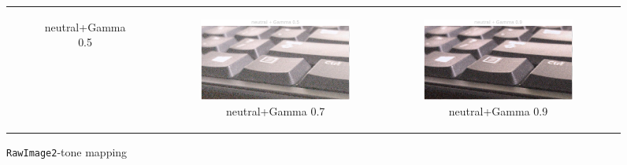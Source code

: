 \documentclass[11pt, a4]{article}
\begin{document}
\begin{enumerate}
\begin{enumerate}
\begin{figure}[h]
{\begin{tabular}{cccc}
\begin{subfigure}[h]{0.45\linewidth}
							\caption{neutral+Gamma 0.5}
							\label{fig:RawImage2_tone_10}
						\end{subfigure} &
						\begin{subfigure}[h]{0.45\linewidth}
							\centering
							\includegraphics[width=\linewidth]{../output/RawImage2_Tone_neutral_Gamma0.5.pdf}
							\caption{neutral+Gamma 0.7}
							\label{fig:RawImage2_tone_11}
						\end{subfigure} &
						\begin{subfigure}[h]{0.45\linewidth}
							\centering
							\includegraphics[width=\linewidth]{../output/RawImage2_Tone_neutral_Gamma0.9.pdf}
							\caption{neutral+Gamma 0.9}
							\label{fig:RawImage2_tone_12}
						\end{subfigure}
					\end{tabular}
				}
				\caption{\texttt{RawImage2}-tone mapping}
				\label{fig:RawImage2_tone}
			\end{figure}
			\begin{figure}[h]
				\centering
\end{figure}
\end{enumerate}
\end{enumerate}
\end{document}
